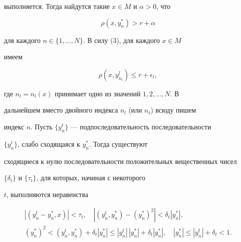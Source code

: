 выполняется. Тогда найдутся такие $x \in M$ и $\alpha > 0$, что


\begin{equation}


\rho(x,y^{*}_{n}) > r + \alpha


\end{equation}


для каждого $n \in \{1, \dotsc,N\}$. В силу (3), для каждого $x \in M$


имеем


\begin{equation}


\rho(x,y^{l}_{n_{l}}) \leq r + \epsilon_{l},


\end{equation}


где $n_{l} = n_{l}(x)$ принимает одно из значений $1,2, \dotsc,N$. В


дальнейшем вместо двойного индекса $n_{l}$ (или $n_{t}$) всюду пишем


индекс $n$. Пусть $\{y^{t}_{n}\}$ --- подпоследовательность последовательности


$\{y^{l}_{n}\}$, слабо сходящаяся к $y^{*}_{n}$. Тогда существуют


сходящиеся к нулю последовательности положительных вещественных чисел


$ \{ \delta_{t} \}$ и $ \{ \tau_{t} \}$, для которых, начиная с некоторого


$ t $, выполняются неравенства


\begin{equation}


\begin{array}{c}


|(y^{t}_{n} - y^{*}_{n},x)| < \tau_{t}, \quad |(y^{t}_{n},y^{*}_{n})


- (y^{*}_{n})^{2}| < \delta_{t}|y^{*}_{n}|, \\[3mm]


(y^{*}_{n})^{2} <


(y^{t}_{n},y^{*}_{n}) + \delta_{t}|y^{*}_{n}|


\leq |y^{t}_{n}|\,|y^{*}_{n}| +


\delta_{t}|y^{*}_{n}|, \quad|y^{*}_{n}| \leq |y^{t}_{n}| +


\delta_{t} < 1.


\end{array}


\end{equation}





